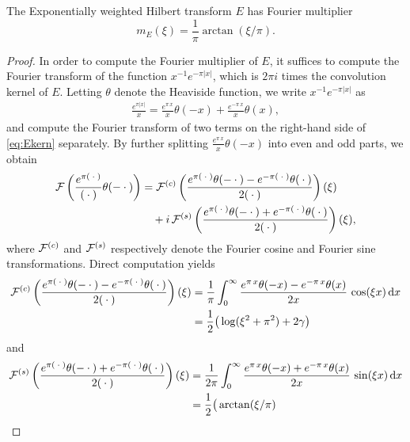 \documentclass[../dissertation.tex]{subfiles}
\begin{document}
\begin{lma}\label{lma:FMultE}
	The Exponentially weighted Hilbert transform $E$ has Fourier multiplier
	$$m_E(\xi) = \frac{1}{\pi} \arctan(\xi/\pi).$$
\end{lma}
\begin{proof}
	In order to compute the Fourier multiplier of $E$, it suf{}fices to compute the Fourier
	transform of the function $x^{-1} e^{-\pi|x|}$, which is $2\pi i$ times the 
	convolution kernel of $E$. Letting $\theta$ denote the Heaviside function, we 
	write $x^{-1} e^{-\pi|x|}$ as 
	\begin{align}\label{eq:Ekern}
		\frac{e^{\pi |x|}}{x} 
			=
			\frac{e^{\pi \, x}}{x} \theta(-x) + \frac{e^{-\pi \, x}}{x} \theta(x),
	\end{align}
	and compute the Fourier transform of two terms on the right-hand side of 
	\eqref{eq:Ekern} separately. By further splitting $\frac{e^{\pi \, x}}{x} \theta(-x)$
	into even and odd parts, we obtain
	\begin{align}
		\mathcal F\left( \frac{e^{\pi (\kern 0.5ex \cdot \kern 0.5ex)}}{(\kern 0.5ex \cdot \kern 0.5ex)} \theta(-\kern 0.5ex \cdot \kern 0.5ex) \right)
			&= \mathcal F^{(c)} \left( 
					\frac{e^{\pi (\kern 0.5ex \cdot \kern 0.5ex)}\theta(-\kern 0.5ex \cdot \kern 0.5ex)-e^{-\pi(\kern 0.5ex \cdot \kern 0.5ex)}\theta(\kern 0.5ex \cdot \kern 0.5ex)}
						{2(\kern 0.5ex \cdot \kern 0.5ex)}  
				\right)(\xi)
				\\
			&\quad + i \, \mathcal F^{(s)} \left(
					\frac{e^{\pi(\kern 0.5ex \cdot \kern 0.5ex)}\theta(-\kern 0.5ex \cdot \kern 0.5ex)+e^{-\pi(\kern 0.5ex \cdot \kern 0.5ex)}\theta(\kern 0.5ex \cdot \kern 0.5ex)}
						{2(\kern 0.5ex \cdot \kern 0.5ex)} 
				\right)(\xi),
				\nonumber
	\end{align}
	where $\mathcal F^{(c)}$ and $\mathcal F^{(s)}$ respectively denote the Fourier cosine and
	Fourier sine transformations. Direct computation yields 
	\begin{align*}
		\mathcal F^{(c)} \left( 
			\frac{e^{\pi (\kern 0.5ex \cdot \kern 0.5ex)}\theta(-\kern 0.5ex \cdot \kern 0.5ex)-e^{-\pi(\kern 0.5ex \cdot \kern 0.5ex)}\theta(\kern 0.5ex \cdot \kern 0.5ex)}
				{2(\kern 0.5ex \cdot \kern 0.5ex)}  
		\right)(\xi)
			&= \frac{1}{\pi}
				\int_0^\infty 
					\frac{e^{\pi \,x}\theta(-x)-e^{-\pi\,x}\theta(x)}{2x}
				\, \cos(\xi x) \, \mathrm{d}x 
				\\
			&= \frac{1}{2} \big(
					\log(\xi^2 + \pi^2) + 2 \gamma
				\big)
				\nonumber
	\end{align*}
	and 
	\begin{align*}
		\mc F^{(s)} \left( 
			\frac{e^{\pi (\dotarg)}\theta(-\dotarg)+e^{-\pi(\dotarg)}\theta(\dotarg)}
				{2(\dotarg)}  
		\right)(\xi)
			&= \frac{1}{2\pi} 
				\int_0^\infty 
					\frac{e^{\pi \,x}\theta(-x)+e^{-\pi\,x}\theta(x)}{2x}
				\, \sin(\xi x) \, \mathrm{d}x 
				\\
			&= \frac{1}{2} \big(
					\arctan(\xi/\pi)

\end{align*}
\end{proof}
\end{document}
